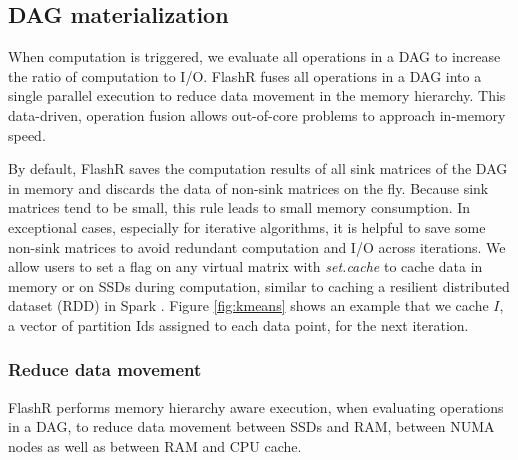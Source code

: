 \subsection{DAG materialization}\label{sec:materialize}
When computation is triggered, we evaluate all operations in a DAG
to increase the ratio of computation to I/O. FlashR fuses all operations in
a DAG into a single parallel execution to reduce data
movement in the memory hierarchy. This data-driven,
operation fusion allows out-of-core problems to approach in-memory speed.

By default, FlashR saves the computation results of all sink matrices of
the DAG in memory and discards the data of non-sink matrices on the fly.
Because sink matrices tend to be small, this rule leads to small memory
consumption. In exceptional cases, especially for iterative algorithms,
it is helpful to save some non-sink matrices to avoid redundant computation
and I/O across iterations. We allow users to
set a flag on any virtual matrix with \textit{set.cache} to
cache data in memory or on SSDs during computation, similar to caching
a resilient distributed dataset (RDD) in Spark \cite{spark}.
Figure \ref{fig:kmeans} shows an example that we cache $I$, a vector of
partition Ids assigned to each data point, for the next iteration.

\subsubsection{Reduce data movement}
FlashR performs memory hierarchy aware execution, when evaluating operations
in a DAG, to reduce data movement
between SSDs and RAM, between NUMA nodes as well as between RAM and CPU cache.

